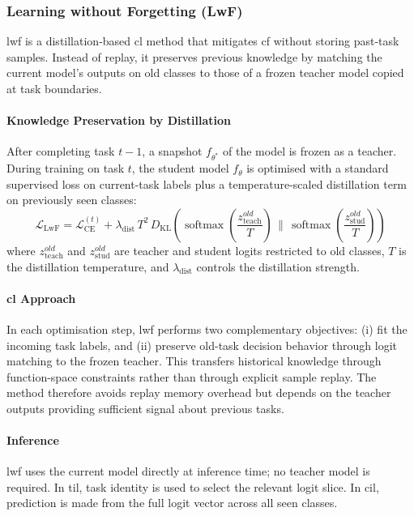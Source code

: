 \subsubsection{Learning without Forgetting (LwF)}

\gls{lwf} is a distillation-based \gls{cl} method that mitigates \gls{cf}
without storing past-task samples. Instead of replay, it preserves previous
knowledge by matching the current model's outputs on old classes to those of a
frozen teacher model copied at task boundaries.

\paragraph{Knowledge Preservation by Distillation}

After completing task $t{-}1$, a snapshot $f_{\theta^*}$ of the model is frozen
as a teacher. During training on task $t$, the student model $f_\theta$ is
optimised with a standard supervised loss on current-task labels plus a
temperature-scaled distillation term on previously seen classes:
%
\begin{equation}\label{eqn:lwf_loss}
    \mathcal{L}_\text{LwF}
    =
    \mathcal{L}_\text{CE}^{(t)}
    +
    \lambda_\text{dist}
    \,T^2\,
    D_\text{KL}
    \!\left(
        \operatorname{softmax}\!\left(\frac{z_\text{teach}^{old}}{T}\right)
        \,\Big\|\,
        \operatorname{softmax}\!\left(\frac{z_\text{stud}^{old}}{T}\right)
    \right)
\end{equation}
%
where $z_\text{teach}^{old}$ and $z_\text{stud}^{old}$ are teacher and student
logits restricted to old classes, $T$ is the distillation temperature, and
$\lambda_\text{dist}$ controls the distillation strength.

\paragraph{\gls{cl} Approach}

In each optimisation step, \gls{lwf} performs two complementary objectives:
(i) fit the incoming task labels, and (ii) preserve old-task decision behavior
through logit matching to the frozen teacher. This transfers historical
knowledge through function-space constraints rather than through explicit sample
replay. The method therefore avoids replay memory overhead but depends on the
teacher outputs providing sufficient signal about previous tasks.

\paragraph{Inference}

\gls{lwf} uses the current model directly at inference time; no teacher model is
required. In \gls{til}, task identity is used to select the relevant logit
slice. In \gls{cil}, prediction is made from the full logit vector across all
seen classes.

